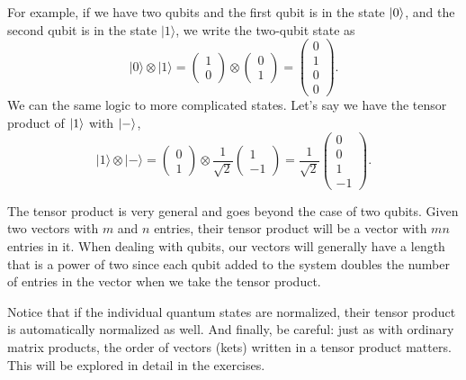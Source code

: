 For example, if we have two qubits and the first qubit is in the state $\left| 0 \right\rangle$, and the second qubit is in the state $|1\rangle$, we write the two-qubit state as
\begin{equation}
|0\rangle \otimes|1\rangle=\left(\begin{array}{l}
1 \\
0
\end{array}\right) \otimes\left(\begin{array}{l}
0 \\
1
\end{array}\right)=\left(\begin{array}{l}
0 \\
1 \\
0 \\
0
\end{array}\right).
\end{equation}
We can the same logic to more complicated states. Let's say we have the tensor product of $\left| 1 \right\rangle$ with $\left| - \right\rangle$,
\begin{equation}
|1\rangle \otimes|-\rangle=\left(\begin{array}{l}
0 \\
1
\end{array}\right) \otimes \frac{1}{\sqrt{2}}\left(\begin{array}{c}
1 \\
-1
\end{array}\right)=\frac{1}{\sqrt{2}}\left(\begin{array}{c}
0 \\
0 \\
1 \\
-1
\end{array}\right).
\end{equation}

The tensor product is very general and goes beyond the case of two qubits. Given two vectors with $m$ and $n$ entries, their tensor product will be a vector with $mn$ entries in it. When dealing with qubits, our vectors will generally have a length that is a power of two since each qubit added to the system doubles the number of entries in the vector when we take the tensor product.

Notice that if the individual quantum states are normalized, their tensor product is automatically normalized as well.
And finally, be careful: just as with ordinary matrix products, the order of vectors (kets) written in a tensor product matters. This will be explored in detail in the exercises.

